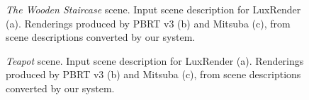 \begin{figure}
{	\label{staircase_Mitsuba}
}
\caption{\textit{The Wooden Staircase} scene. Input scene description for LuxRender (a).
Renderings produced by PBRT v3 (b) and Mitsuba (c),
from scene descriptions converted by our system. }
\label{fig:staircase}
\end{figure}

\begin{figure}
\centering

%
\caption{\textit{Teapot} scene. Input scene description for LuxRender (a).	Renderings produced by PBRT v3 (b) and Mitsuba (c),
	from scene descriptions converted by our system.}
\label{fig:teapot}
\end{figure}

